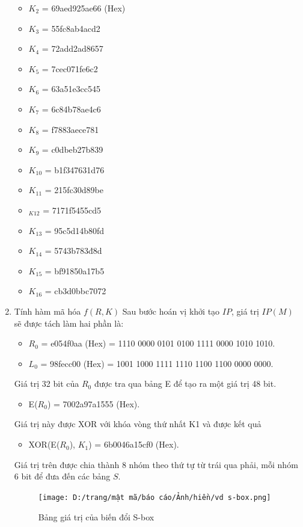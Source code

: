 \begin{enumerate}
\begin{itemize}
        \item $K_2$ = 69aed925ae66 (Hex) 
        \item $K_3$ = 55fc8ab4acd2 
        \item $K_4$ = 72add2ad8657 
        \item $K_5$ = 7cec071fe6c2 
        \item $K_6$ = 63a51e3cc545 
        \item $K_7$ = 6c84b78ae4c6 
        \item $K_8$ = f7883aece781 
        \item $K_9$ = c0dbeb27b839 
        \item $K_{10}$ = b1f347631d76 
        \item $K_{11}$ = 215fc30d89be 
        \item $_{K12}$ = 7171f5455cd5 
        \item $K_{13}$ = 95c5d14b80fd 
        \item $K_{14}$ = 5743b783đ8d 
        \item $K_{15}$ = bf91850a17b5 
        \item $K_{16}$ = cb3d0bbc7072
    \end{itemize}
    \item Tính hàm mã hóa $f(R,K)$
    Sau bước hoán vị khởi tạo $IP$, giá trị $IP(M)$ sẽ được tách làm hai phần là: 
    \begin{itemize}
        \item $R_{0}$ = e054f0aa (Hex) = 1110 0000 0101 0100 1111 0000 1010 1010. 
        \item $L_{0}$ = 98fecc00 (Hex) = 1001 1000 1111 1110 1100 1100 0000 0000. 
    \end{itemize}
    Giá trị 32 bit của $R_{0}$ được tra qua bảng E để tạo ra một giá trị 48 bit. 
    \begin{itemize}
        \item E($R_{0}$) = 7002a97a1555 (Hex). 
    \end{itemize}
    Giá trị này được XOR với khóa vòng thứ nhất K1 và được kết quả
    \begin{itemize}
        \item XOR(E($R_{0}$), $K_1$) = 6b0046a15cf0 (Hex).
    \end{itemize}
    Giá trị trên được chia thành 8 nhóm theo thứ tự từ trái qua phải, mỗi nhóm 6 bit để đưa đến các bảng $S$.
    \begin{figure}[H]
        \centering
        \texttt{[image: D:/trang/mật mã/báo cáo/Ảnh/hiền/vd s-box.png]}
        \caption{Bảng giá trị của biến đổi S-box}

\end{figure}
\end{enumerate}
